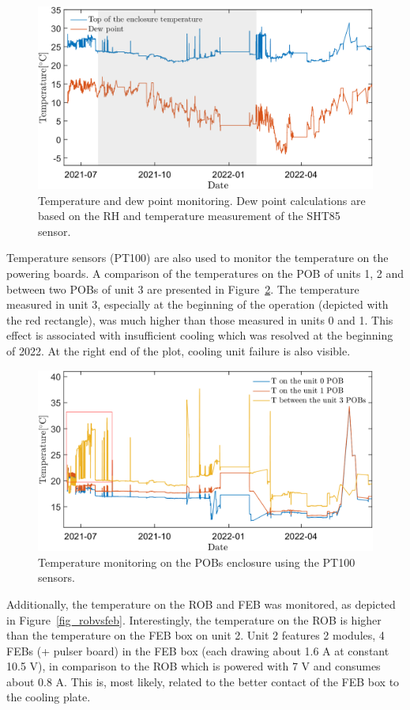 \begin{figure}[!h]
\centering
\includegraphics[width=0.9\columnwidth]{Chapter6/DCS/images/dew.png}
\caption{Temperature and dew point monitoring. Dew point calculations are based on the \gls{RH} and temperature measurement of the SHT85 sensor.}
\label{fig_dew}
\end{figure}


Temperature sensors (PT100) are also used to monitor the temperature on the powering boards. A comparison of the temperatures on the \gls{POB} of units 1, 2 and between two \glspl{POB} of unit 3 are presented in Figure~\ref{fig_POB1}. The temperature measured in unit 3, especially at the beginning of the operation (depicted with the red rectangle), was much higher than those measured in units 0 and 1. This effect is associated with insufficient cooling which was resolved at the beginning of 2022. At the right end of the plot, cooling unit failure is also visible.
\begin{figure}[!h]
\centering
\includegraphics[width=0.9\columnwidth]{Chapter6/DCS/images/POB1.png}
\caption{Temperature monitoring on the \glspl{POB} enclosure using the PT100 sensors.}
\label{fig_POB1}
\end{figure}

Additionally, the temperature on the \gls{ROB} and \gls{FEB} was monitored, as depicted in Figure~\ref{fig_robvsfeb}. Interestingly, the temperature on the \gls{ROB} is higher than the temperature on the \gls{FEB} box on unit 2. Unit 2 features 2 modules, 4 \gls{FEB}s (+ pulser board) in the \gls{FEB} box (each drawing about 1.6 A at constant 10.5 V), in comparison to the \gls{ROB} which is powered with 7 V and consumes about 0.8 A. This is, most likely, related to the better contact of the \gls{FEB} box to the cooling plate.

